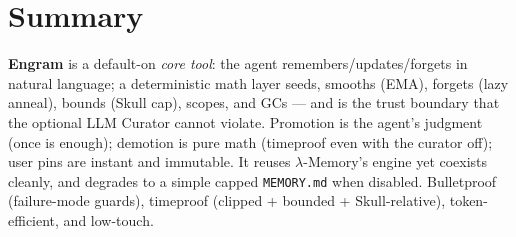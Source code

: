 \documentclass[11pt]{article}
\begin{document}
\section{Summary}
\textbf{Engram} is a default-on \emph{core tool}: the agent remembers/updates/forgets in natural language; a deterministic math layer seeds, smooths (EMA), forgets (lazy anneal), bounds (Skull cap), scopes, and GCs — and is the trust boundary that the optional LLM Curator cannot violate. Promotion is the agent's judgment (once is enough); demotion is pure math (timeproof even with the curator off); user pins are instant and immutable. It reuses $\lambda$-Memory's engine yet coexists cleanly, and degrades to a simple capped \texttt{MEMORY.md} when disabled. Bulletproof (failure-mode guards), timeproof (clipped + bounded + Skull-relative), token-efficient, and low-touch.
\end{document}
